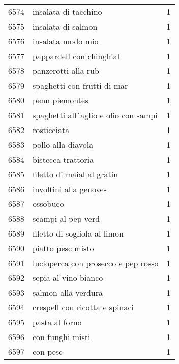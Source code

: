 \begin{tabular}{llr}
6574 &                               insalata di tacchino &      1 \\
6575 &                                 insalata di salmon &      1 \\
6576 &                                  insalata modo mio &      1 \\
6577 &                           pappardell con chinghial &      1 \\
6578 &                                panzerotti alla rub &      1 \\
6579 &                        spaghetti con frutti di mar &      1 \\
6580 &                                     penn piemontes &      1 \\
6581 &               spaghetti all´aglio e olio con sampi &      1 \\
6582 &                                        rosticciata &      1 \\
6583 &                                 pollo alla diavola &      1 \\
6584 &                                 bistecca trattoria &      1 \\
6585 &                         filetto di maial al gratin &      1 \\
6586 &                             involtini alla genoves &      1 \\
6587 &                                           ossobuco &      1 \\
6588 &                                 scampi al pep verd &      1 \\
6589 &                       filetto di sogliola al limon &      1 \\
6590 &                                  piatto pesc misto &      1 \\
6591 &                lucioperca con prosecco e pep rosso &      1 \\
6592 &                               sepia al vino bianco &      1 \\
6593 &                                salmon alla verdura &      1 \\
6594 &                     crespell con ricotta e spinaci &      1 \\
6595 &                                     pasta al forno &      1 \\
6596 &                                   con funghi misti &      1 \\
6597 &                                           con pesc &      1 \\

\end{tabular}
